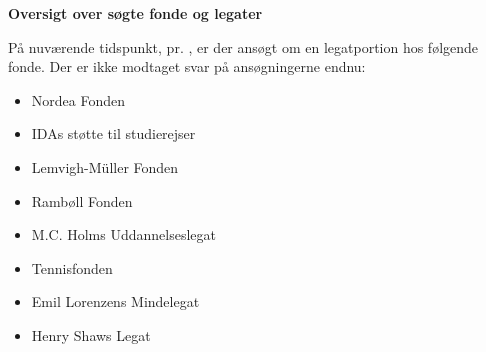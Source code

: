 \documentclass[../Ansoegning.tex]{subfiles}
\begin{document}
\begin{center}
    \Large{\textbf{Oversigt over søgte fonde og legater}}
\end{center}

På nuværende tidspunkt, pr. \Dato, er der ansøgt om en legatportion hos følgende fonde. Der er ikke modtaget svar på ansøgningerne endnu:

\begin{itemize}
    \item Nordea Fonden
    \item IDAs støtte til studierejser
    \item Lemvigh-Müller Fonden
    \item Rambøll Fonden
    \item M.C. Holms Uddannelseslegat
    \item Tennisfonden
    \item Emil Lorenzens Mindelegat
    \item Henry Shaws Legat
\end{itemize}
\end{document}
